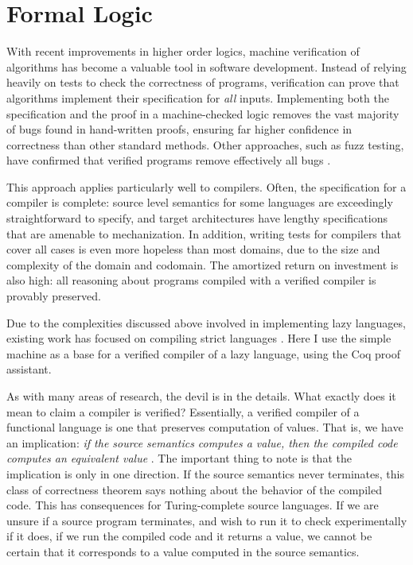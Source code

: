 \section{Formal Logic} \label{sec:background}

With recent improvements in higher order logics, machine verification of
algorithms has become a valuable tool in software development. Instead of
relying heavily on tests to check the correctness of programs, verification can
prove that algorithms implement their specification for \emph{all} inputs.
Implementing both the specification and the proof in a machine-checked logic
removes the vast majority of bugs found in hand-written proofs, ensuring far
higher confidence in correctness than other standard methods. Other approaches,
such as fuzz testing, have confirmed that verified programs remove effectively
all bugs \cite{yangfuzz}.

This approach applies particularly well to compilers. Often, the specification
for a compiler is complete: source level semantics for some languages are
exceedingly straightforward to specify, and target architectures have lengthy
specifications that are amenable to mechanization. In addition, writing tests
for compilers that cover all cases is even more hopeless than most domains, due
to the size and complexity of the domain and codomain. The amortized return on
investment is also high: all reasoning about programs compiled with a verified
compiler is provably preserved. 

Due to the complexities discussed above involved in implementing lazy languages,
existing work has focused on compiling strict languages
\cite{chlipala2007certified, leroy2012compcert, cakeml14}. Here I use the
simple \ce machine as a base for a verified compiler of a lazy language, using
the Coq proof assistant. 

As with many areas of research, the devil is in the details. What exactly does
it mean to claim a compiler is verified?  Essentially, a verified compiler of a
functional language is one that preserves computation of values. That is, we
have an implication: \emph{if the source semantics computes a
value, then the compiled code computes an equivalent value}
\cite{chlipala2007certified}. The important thing to note is that the
implication is only in one direction. If the source semantics never terminates,
this class of correctness theorem says nothing about the behavior of the
compiled code. This has consequences for Turing-complete source languages. If we
are unsure if a source program terminates, and wish to run it to check
experimentally if it does, if we run the compiled code and it returns a value,
we cannot be certain that it corresponds to a value computed in the source
semantics. 

